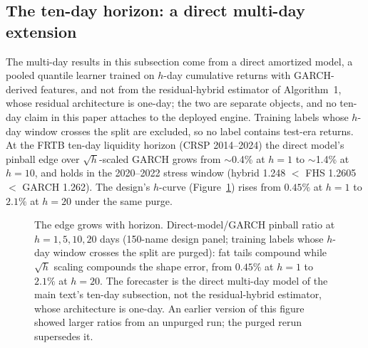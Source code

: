 \documentclass[11pt]{article}
\theoremstyle{remark}
\begin{document}
\subsection{The ten-day horizon: a direct multi-day extension}

The multi-day results in this subsection come from a direct amortized model, a pooled quantile learner trained on $h$-day
cumulative returns with GARCH-derived features, and not from the residual-hybrid estimator of Algorithm~1, whose residual
architecture is one-day; the two are separate objects, and no
ten-day claim in this paper attaches to the deployed engine. Training
labels whose $h$-day window crosses the split are excluded, so no
label contains test-era returns. At the FRTB ten-day
liquidity horizon (CRSP 2014--2024) the direct model's pinball edge
over $\sqrt{h}$-scaled GARCH grows
from $\sim$0.4\% at $h=1$ to $\sim$1.4\% at $h=10$, and holds in the
2020--2022 stress window (hybrid 1.248 $<$ FHS 1.2605 $<$ GARCH 1.262).
The design's $h$-curve (Figure~\ref{fig:horizon}) rises from
$0.45\%$ at $h{=}1$ to $2.1\%$ at $h{=}20$ under the same purge.
\begin{figure}[t]
\centering
{}
\caption{The edge grows with horizon. Direct-model/GARCH pinball
ratio at $h = 1, 5, 10, 20$ days (150-name design panel; training
labels whose $h$-day window crosses the split are purged): fat tails
compound while $\sqrt{h}$ scaling compounds the shape error, from $0.45\%$ at $h{=}1$ to $2.1\%$ at $h{=}20$. The forecaster is the
direct multi-day model of the main text's ten-day subsection,
not the residual-hybrid estimator, whose architecture is
one-day. An earlier version of this figure showed larger ratios from
an unpurged run; the purged rerun supersedes it.}
\label{fig:horizon}
\end{figure}
\end{document}
